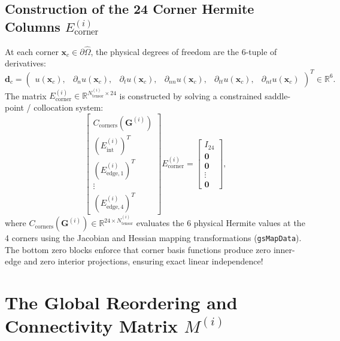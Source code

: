 \documentclass[11pt,a4paper]{article}
\newcommand{\R}{\mathbb{R}}
\newcommand{\mb}[1]{\mathbf{#1}}
\begin{document}
\subsection{Construction of the 24 Corner Hermite Columns \texorpdfstring{$E_{\text{corner}}^{(i)}$}{E-corner(i)}}
At each corner $\mathbf{x}_c \in \partial\widehat{\Omega}$, the physical degrees of freedom are the 6-tuple of derivatives:
\begin{equation}
    \mathbf{d}_c = \begin{pmatrix} u(\mathbf{x}_c), & \partial_n u(\mathbf{x}_c), & \partial_t u(\mathbf{x}_c), & \partial_{nn} u(\mathbf{x}_c), & \partial_{tt} u(\mathbf{x}_c), & \partial_{nt} u(\mathbf{x}_c) \end{pmatrix}^T \in \R^6.
\end{equation}
The matrix $E_{\text{corner}}^{(i)} \in \R^{N_{\text{tensor}}^{(i)} \times 24}$ is constructed by solving a constrained saddle-point / collocation system:
\begin{equation} \label{eq:corner_collocation}
    \begin{bmatrix}
        C_{\text{corners}}(\mathbf{G}^{(i)}) \\
        (E_{\text{int}}^{(i)})^T \\
        (E_{\text{edge}, 1}^{(i)})^T \\
        \vdots \\
        (E_{\text{edge}, 4}^{(i)})^T
    \end{bmatrix} E_{\text{corner}}^{(i)} = \begin{bmatrix}
        I_{24} \\
        \mb{0} \\
        \mb{0} \\
        \vdots \\
        \mb{0}
    \end{bmatrix},
\end{equation}
where $C_{\text{corners}}(\mathbf{G}^{(i)}) \in \R^{24 \times N_{\text{tensor}}^{(i)}}$ evaluates the 6 physical Hermite values at the 4 corners using the Jacobian and Hessian mapping transformations (\texttt{gsMapData}). The bottom zero blocks enforce that corner basis functions produce zero inner-edge and zero interior projections, ensuring exact linear independence!

\newpage
\section{The Global Reordering and Connectivity Matrix \texorpdfstring{$M^{(i)}$}{M(i)}}
\end{document}

